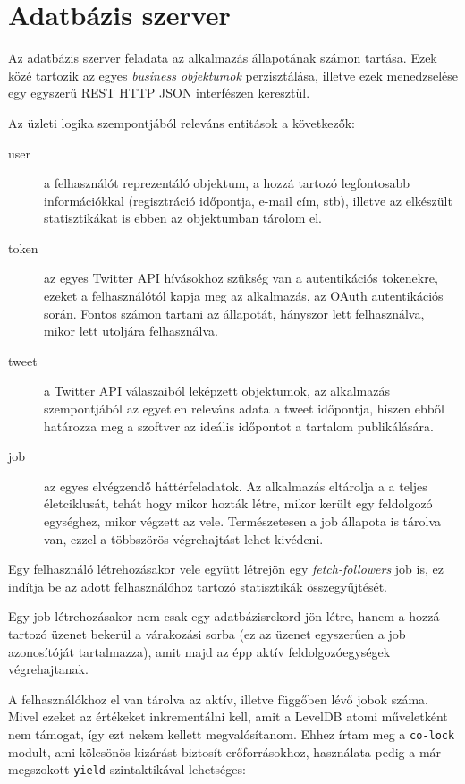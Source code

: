 \section{Adatbázis szerver}

Az adatbázis szerver feladata az alkalmazás állapotának számon tartása.
Ezek közé tartozik az egyes \emph{business objektumok} perzisztálása,
illetve ezek menedzselése egy egyszerű REST HTTP JSON interfészen keresztül.

Az üzleti logika szempontjából releváns entitások a következők:

\begin{description}
  \item[user] a felhasználót reprezentáló objektum, a hozzá tartozó
    legfontosabb információkkal (regisztráció időpontja, e-mail cím, stb),
    illetve az elkészült statisztikákat is ebben az objektumban tárolom el.
  \item[token] az egyes Twitter API hívásokhoz szükség van a autentikációs
  tokenekre, ezeket a felhasználótól kapja meg az alkalmazás, az OAuth
  autentikációs során. Fontos számon tartani az állapotát, hányszor lett
  felhasználva, mikor lett utoljára felhasználva.
  \item[tweet] a Twitter API válaszaiból leképzett objektumok, az alkalmazás
  szempontjából az egyetlen releváns adata a tweet időpontja, hiszen ebből
  határozza meg a szoftver az ideális időpontot a tartalom publikálására.
  \item[job] az egyes elvégzendő háttérfeladatok. Az alkalmazás eltárolja a
  a teljes életciklusát, tehát hogy mikor hozták létre, mikor került egy
  feldolgozó egységhez, mikor végzett az vele. Természetesen a job állapota
  is tárolva van, ezzel a többszörös végrehajtást lehet kivédeni.
\end{description}

Egy felhasználó létrehozásakor vele együtt létrejön egy \emph{fetch-followers}
job is, ez indítja be az adott felhasználóhoz tartozó statisztikák
összegyűjtését.

Egy job létrehozásakor nem csak egy adatbázisrekord jön létre, hanem a
hozzá tartozó üzenet bekerül a várakozási sorba (ez az üzenet egyszerűen
a job azonosítóját tartalmazza), amit majd az épp aktív feldolgozóegységek
végrehajtanak.

A felhasználókhoz el van tárolva az aktív, illetve függőben lévő jobok
száma. Mivel ezeket az értékeket inkrementálni kell, amit a LevelDB atomi
műveletként nem támogat, így ezt nekem kellett megvalósítanom.
Ehhez írtam meg a \verb=co-lock= modult, ami kölcsönös kizárást biztosít
erőforrásokhoz, használata pedig a már megszokott \verb=yield= szintaktikával
lehetséges:

